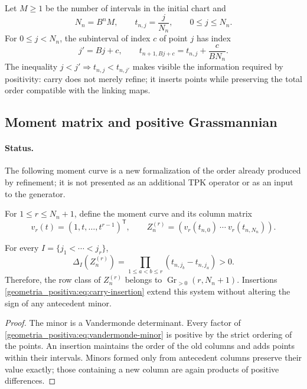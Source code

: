 Let \(M\ge1\) be the number of intervals in the initial chart and
\begin{equation}
 N_n=B^nM,\qquad t_{n,j}=\frac{j}{N_n},\qquad 0\le j\le N_n.
 \label{geometria_positiva:eq:ordered-carry-points}
\end{equation}
For \(0\le j<N_n\), the subinterval of index \(c\) of point \(j\) has index
\begin{equation}
 j'=Bj+c,\qquad
 t_{n+1,Bj+c}=t_{n,j}+\frac{c}{BN_n}.
 \label{geometria_positiva:eq:carry-insertion}
\end{equation}
The inequality \(j<j'\Rightarrow t_{n,j}<t_{n,j'}\) makes visible the information required by positivity: carry does not merely refine; it inserts points while preserving the total order compatible with the linking maps.

\subsection{Moment matrix and positive Grassmannian}

\paragraph{Status.}
The following moment curve is a new formalization of the order already produced by refinement; it is not presented as an additional TPK operator or as an input to the generator.

For \(1\le r\le N_n+1\), define the moment curve and its column matrix
\[
 v_r(t)=(1,t,\ldots,t^{r-1})^{\mathsf T},\qquad
 Z_n^{(r)}=(v_r(t_{n,0})\ \cdots\ v_r(t_{n,N_n})).
\]

\begin{theorem}
\label{geometria_positiva:thm:tpk-vandermonde-positive}
For every \(I=\{j_1<\cdots<j_r\}\),
\begin{equation}
 \Delta_I(Z_n^{(r)})
 =\prod_{1\le a<b\le r}(t_{n,j_b}-t_{n,j_a})>0.
 \label{geometria_positiva:eq:vandermonde-minor}
\end{equation}
Therefore, the row class of \(Z_n^{(r)}\) belongs to \(\operatorname{Gr}_{>0}(r,N_n+1)\). Insertions \eqref{geometria_positiva:eq:carry-insertion} extend this system without altering the sign of any antecedent minor.
\end{theorem}
\begin{proof}
The minor is a Vandermonde determinant. Every factor of \eqref{geometria_positiva:eq:vandermonde-minor} is positive by the strict ordering of the points. An insertion maintains the order of the old columns and adds points within their intervals. Minors formed only from antecedent columns preserve their value exactly; those containing a new column are again products of positive differences.
\end{proof}

